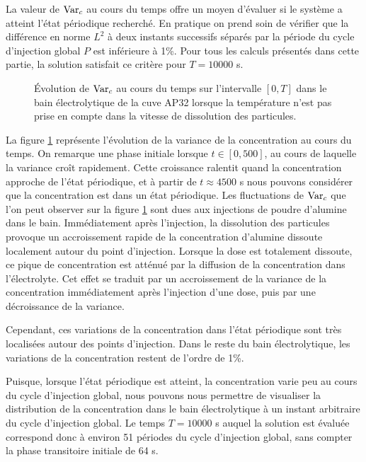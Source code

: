 La valeur de $\operatorname{Var}_c$ au cours du temps offre un moyen
d'évaluer si le système a atteint l'état périodique
recherché. En pratique on prend soin de
vérifier que la différence en norme $L^2$ à deux instants successifs
séparés par la période du cycle d'injection global $P$ est inférieure
à \num{1}\%. Pour tous les calculs présentés dans cette partie, la
solution satisfait ce critère pour $T = \num{10000}$ \si{\second}.

\begin{figure}
  \begin{center}
    
    \caption{Évolution de $\operatorname{Var}_c$ au cours du temps sur
      l'intervalle $[0, T]$ dans le bain électrolytique de la cuve
      AP32 lorsque la température n'est pas prise en compte dans la
      vitesse de dissolution des particules.}
    \label{fig:alumin-control-var}
  \end{center}
\end{figure}

La figure \ref{fig:alumin-control-var} représente l'évolution de
la variance de la concentration au cours du temps. On remarque une
phase initiale lorsque $t\in[0,500]$, au cours de laquelle la variance
croît rapidement. Cette croissance ralentit quand la concentration
approche de l'état périodique, et à partir de $t \approx
\num{4500}$ \si{\second} nous pouvons considérer que la
concentration est dans un état périodique. Les
fluctuations de $\operatorname{Var}_c$ que l'on peut observer sur la
figure \ref{fig:alumin-control-var} sont dues aux injections de poudre
d'alumine dans le bain. Immédiatement après l'injection, la
dissolution des particules provoque un accroissement rapide de la
concentration d'alumine dissoute localement autour du point
d'injection. Lorsque la dose est totalement dissoute, ce pique de
concentration est atténué par la diffusion de la concentration
dans l'électrolyte. Cet effet se traduit par un accroissement de la
variance de la concentration immédiatement après l'injection d'une
dose, puis par une décroissance de la variance.

Cependant, ces variations de la concentration dans l'état
périodique sont très localisées autour des points d'injection. Dans
le reste du bain électrolytique, les variations de la concentration
restent de l'ordre de \num{1}\%.

Puisque, lorsque l'état périodique est atteint, la
concentration varie peu au cours du cycle d'injection global, nous
pouvons nous permettre de visualiser la distribution de la
concentration dans le bain électrolytique à un instant arbitraire du
cycle d'injection global. Le temps $T = \num{10000}$ \si{\second}
auquel la solution est évaluée correspond donc à environ \num{51}
périodes du cycle d'injection global, sans compter la phase
transitoire initiale de \num{64} \si{\second}.


